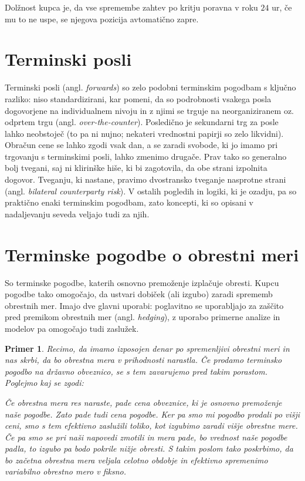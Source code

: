 \documentclass[a4paper, 11pt]{article}
\newtheorem{primer}{Primer}
\begin{document}
Dolžnost kupca je, da vse spremembe zahtev po kritju poravna v roku $24$ ur, če mu to ne uspe, se
njegova pozicija avtomatično zapre.

\section{Terminski posli}
Terminski posli (angl. \textit{forwards}) so zelo podobni terminskim pogodbam s ključno razliko:
niso standardizirani, kar pomeni, da so podrobnosti vsakega posla dogovorjene na individualnem nivoju 
in z njimi se trguje na neorganiziranem oz. odprtem trgu (angl. \textit{over-the-counter}). Posledično 
je sekundarni trg za posle lahko neobstoječ (to pa ni nujno; nekateri vrednostni papirji so zelo 
likvidni). Obračun cene se lahko zgodi vsak dan, a se zaradi svobode, ki jo imamo pri trgovanju s 
terminskimi posli, lahko zmenimo drugače. Prav tako so generalno bolj tvegani, saj ni klirinške hiše, 
ki bi zagotovila, da obe strani izpolnita dogovor. Tveganju, ki nastane, pravimo dvostransko tveganje 
nasprotne strani (angl. \textit{bilateral counterparty risk}). V ostalih pogledih in logiki, ki je 
ozadju, pa so praktično enaki terminskim pogodbam, zato koncepti, ki so opisani v nadaljevanju seveda 
veljajo tudi za njih.

\section{Terminske pogodbe o obrestni meri}
So terminske pogodbe, katerih osnovno premoženje izplačuje obresti. Kupcu pogodbe tako omogočajo, da 
ustvari dobiček (ali izgubo) zaradi sprememb obrestnih mer. Imajo dve glavni uporabi: poglavitno se 
uporabljajo za zaščito pred premikom obrestnih mer (angl. \textit{hedging}), z uporabo primerne analize 
in modelov pa omogočajo tudi zaslužek. 

\begin{primer}
    Recimo, da imamo izposojen denar po spremenljivi obrestni meri in nas skrbi, da bo obrestna mera v 
    prihodnosti narastla. Če prodamo terminsko pogodbo na državno obveznico, se s tem zavarujemo pred 
    takim porastom. Poglejmo kaj se zgodi:

    Če obrestna mera res naraste, pade cena obveznice, ki je osnovno premoženje naše pogodbe. Zato pade
    tudi cena pogodbe. Ker pa smo mi pogodbo prodali po višji ceni, smo s tem efektivno zaslužili toliko, 
    kot izgubimo zaradi višje obrestne mere. Če pa smo se pri naši napovedi zmotili in mera pade, bo 
    vrednost naše pogodbe padla, to izgubo pa bodo pokrile nižje obresti. S takim poslom tako poskrbimo, 
    da bo začetna obrestna mera veljala celotno obdobje in efektivno spremenimo variabilno obrestno mero 
    v fiksno. 
\end{primer}
\end{document}
